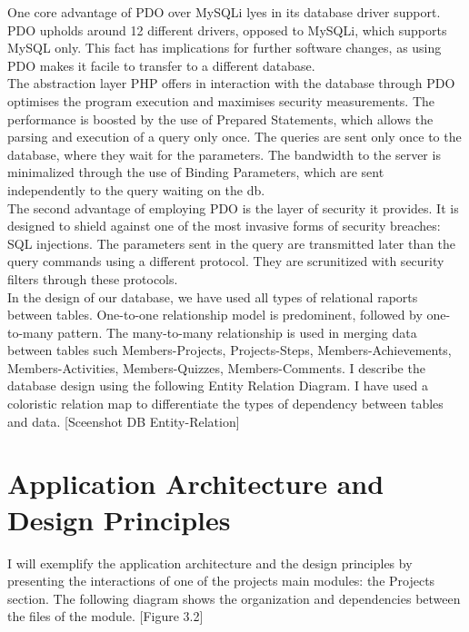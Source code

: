 One core advantage of PDO over MySQLi lyes in its database driver support. PDO upholds around 12 different drivers, opposed to MySQLi, which supports MySQL only. This fact has implications for further software changes, as using PDO makes it facile to transfer to a different database.\\  

The abstraction layer PHP offers in interaction with the database through PDO optimises the program execution and maximises security measurements.
The performance is boosted by the use of Prepared Statements, which allows the parsing and execution of a query only once. The queries are sent only once to the database, where they wait for the parameters. The bandwidth to the server is minimalized through the use of Binding Parameters, which are sent independently to the query waiting on the db.\\ 

The second advantage of employing PDO is the layer of security it provides. It is designed to shield against one of the most invasive forms of security breaches: SQL injections. The parameters sent in the query are transmitted later than the query commands using a different protocol. They are scrunitized with security filters through these protocols.\\ 

In the design of our database, we have used all types of relational raports between tables. One-to-one relationship model is predominent, followed by one-to-many pattern. 
The many-to-many relationship is used in merging data between tables such Members-Projects, Projects-Steps, Members-Achievements, Members-Activities, Members-Quizzes, Members-Comments.
I describe the database design using the following Entity Relation Diagram. I have used a coloristic relation map to differentiate the types of dependency between tables and data.
[Sceenshot DB Entity-Relation]\\


\section{Application Architecture and Design Principles}

I will exemplify the application architecture and the design principles by presenting the interactions of one of the projects main modules: the Projects section. The following diagram shows the organization and dependencies between the files of the module. [Figure 3.2]

